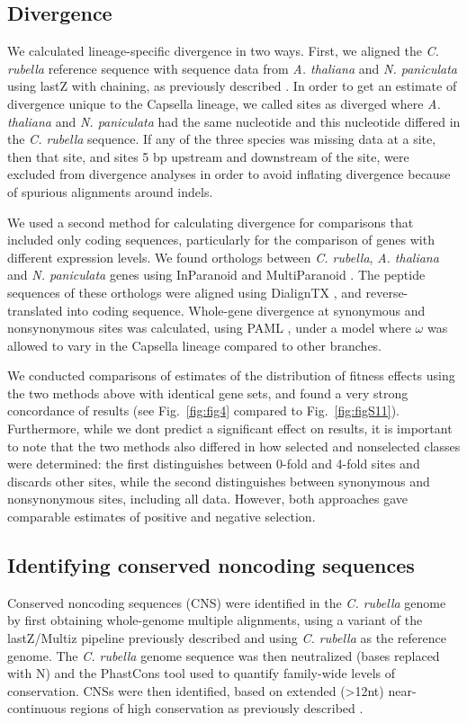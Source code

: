 \subsection{Divergence}

We calculated lineage-specific divergence in two ways. First, we aligned the \textit{C. rubella} reference sequence with sequence data from \textit{A. thaliana} and \textit{N. paniculata} using lastZ \citep{lastz} with chaining, as previously described \citep{Haudry2013-qe}. In order to get an estimate of divergence unique to the Capsella lineage, we called sites as diverged where \textit{A. thaliana} and \textit{N. paniculata} had the same nucleotide and this nucleotide differed in the \textit{C. rubella} sequence. If any of the three species was missing data at a site, then that site, and sites 5 bp upstream and downstream of the site, were excluded from divergence analyses in order to avoid inflating divergence because of spurious alignments around indels.

We used a second method for calculating divergence for comparisons that included only coding sequences, particularly for the comparison of genes with different expression levels. We found orthologs between \textit{C. rubella}, \textit{A. thaliana} and \textit{N. paniculata} genes using InParanoid \citep{inparanoid} and MultiParanoid \citep{multiparanoid}. The peptide sequences of these orthologs were aligned using DialignTX \citep{dialign}, and reverse-translated into coding sequence. Whole-gene divergence at synonymous and nonsynonymous sites was calculated, using PAML \citep{Yang2007-rs}, under a model where $\omega$ was allowed to vary in the Capsella lineage compared to other branches.

We conducted comparisons of estimates of the distribution of fitness effects using the two methods above with identical gene sets, and found a very strong concordance of results (see Fig.~\ref{fig:fig4} compared to Fig.~\ref{fig:figS11}). Furthermore, while we don\textsc{}t predict a significant effect on results, it is important to note that the two methods also differed in how selected and nonselected classes were determined: the first distinguishes between 0-fold and 4-fold sites and discards other sites, while the second distinguishes between synonymous and nonsynonymous sites, including all data. However, both approaches gave comparable estimates of positive and negative selection.

\subsection{Identifying conserved noncoding sequences}
Conserved noncoding sequences (CNS) were identified in the \textit{C. rubella} genome by first obtaining whole-genome multiple alignments, using a variant of the lastZ/Multiz pipeline previously described \citep{Haudry2013-qe,blanchette2004} and using \textit{C. rubella} as the reference genome. The \textit{C. rubella} genome sequence was then neutralized (bases replaced with N) and the PhastCons tool used to quantify family-wide levels of conservation. CNSs were then identified, based on extended (>12nt) near-continuous regions of high conservation as previously described \citep{Haudry2013-qe}.

